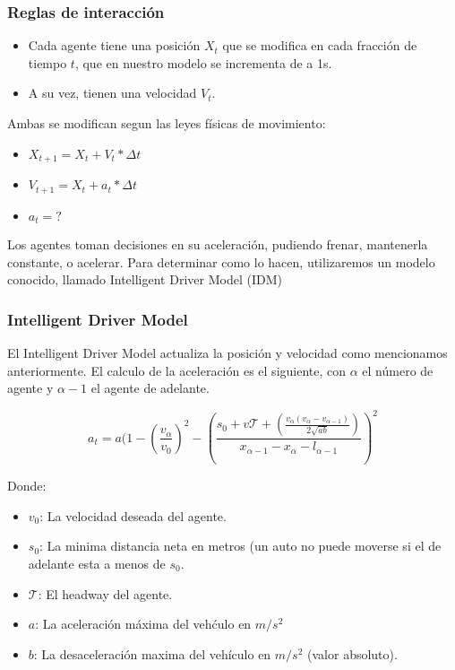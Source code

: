 \documentclass[10pt, compress]{beamer}
\begin{document}
\begin{frame}[fragile]

\frametitle{Reglas de interacci\'on}
\begin{itemize}
\item Cada agente tiene una posici\'on $X_t$ que se modifica en cada fracci\'on de tiempo $t$, que en nuestro modelo se incrementa de a 1s.
\item A su vez, tienen una velocidad $V_t$.
\end{itemize}
Ambas se modifican segun las leyes f\'isicas de movimiento:
\begin{itemize}
\item $X_{t+1} = X_t + V_t * \Delta t$
\item $V_{t+1} = X_t + a_t * \Delta t$
\item $a_t = ?$ 
\end{itemize}

Los agentes toman decisiones en su aceleraci\'on, pudiendo frenar, mantenerla constante, o acelerar. Para determinar como lo hacen, utilizaremos un modelo conocido, llamado Intelligent Driver Model (IDM) \supercite{1}

\end{frame}

\begin{frame}[fragile]

\frametitle{Intelligent Driver Model}
El Intelligent Driver Model actualiza la posici\'on y velocidad como mencionamos anteriormente. El calculo de la aceleraci\'on es el siguiente, con $\alpha$ el n\'umero de agente y $\alpha - 1$ el agente de adelante.

  \begin{equation*}
    a_t = a (1 - (\frac{v_\alpha}{v_0})^2 - (\frac{s_0 + v\mathcal{T} + (\frac{v_\alpha (v_\alpha - v_{\alpha-1})}{2\sqrt{ab}})}{x_{\alpha-1} - x_\alpha - l_{\alpha-1}})^2
  \end{equation*}

Donde:
\begin{itemize}
\item $v_0$: La velocidad deseada del agente.
\item $s_0$: La minima distancia neta en metros (un auto no puede moverse si el de adelante esta a menos de $s_0$.
\item $\mathcal{T}$: El headway del agente.
\item $a$: La aceleraci\'on m\'axima del veh\'culo en $m/s^2$
\item $b$: La desaceleraci\'on maxima del veh\'iculo en $m/s^2$ (valor absoluto).
\end{itemize}

\end{frame}
\end{document}
